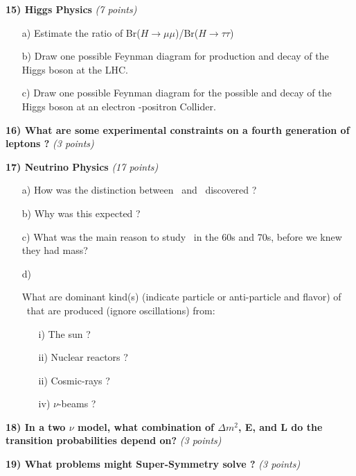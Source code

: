{\clearpage

\textbf{15) Higgs Physics } \textit{(7 points)}\\
\begin{itemize}
\item[a)]{Estimate the ratio of Br($H\rightarrow\mu\mu$)/Br($H\rightarrow\tau\tau$) 
\vspace{2.0in}
}
\item[b)]{Draw one possible Feynman diagram for production and decay of the Higgs boson at the LHC.
\vspace{1.0in}
}
\item[c)]{Draw one possible Feynman diagram for the possible and decay of the Higgs boson at an electron -positron Collider.
\vspace{1.0in}
}
\end{itemize}

\textbf{16) What are some experimental constraints on a fourth generation of leptons ? } \hfill \textit{(3 points)}\\
\vspace{1.0in}


\clearpage

\textbf{17) Neutrino Physics } \hfill \textit{(17 points)}\\
\begin{itemize}
\item[a)]{How was the distinction between \numu\ and \nue\ discovered ?
\vspace*{1in}
}

\item[b)]{Why was this expected ?
\vspace*{1in}
}
\item[c)]{What was the main reason to study \nus\ in the 60s and 70s, before we knew they had mass?
\vspace*{1in}
}
\item[d)]{What are dominant kind(s) (indicate particle or anti-particle and flavor) of \nus\ that are produced (ignore oscillations) from:
\begin{itemize}
\item[i)]{ The sun ? 
\vspace*{0.5in}
} 
\item[ii)]{Nuclear reactors ? 
\vspace*{0.5in}
}
\item[ii)]{Cosmic-rays ? 
\vspace*{0.5in}
}
\item[iv)]{$\nu$-beams ?
\vspace*{0.5in}
}
\end{itemize}
}
\end{itemize}


\textbf{18) In a two $\nu$ model, what combination of $\Delta m^2$, E, and L do the transition probabilities depend on?  } \hfill \textit{(3 points)}\\
\vspace*{2in}

\textbf{19) What problems might Super-Symmetry solve ? } \hfill \textit{(3 points)}\\
\vspace{1in}

} %

